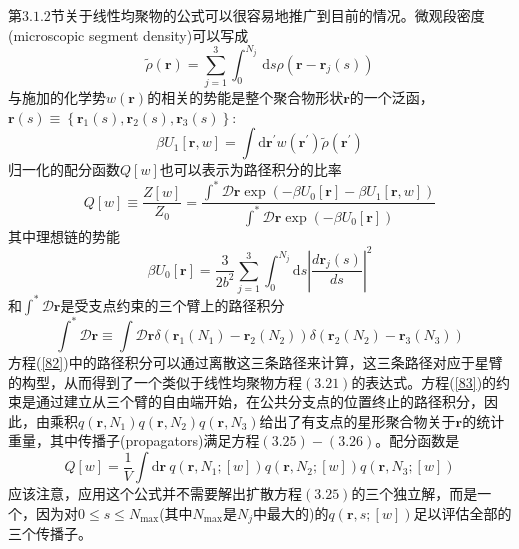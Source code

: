 第$3.1.2$节关于线性均聚物的公式可以很容易地推广到目前的情况。微观段密度(microscopic segment density)可以写成
\begin{equation}
\tilde{\rho}(\mathbf{r})=\sum_{j=1}^3 \int_{0}^{N_j}\, \mathrm{d}s\rho(\mathbf{r}-\mathbf{r}_{j}(s))
\end{equation}
与施加的化学势$w (\mathbf{r})$的相关的势能是整个聚合物形状$\mathbf{r}$的一个泛函，$\mathbf{r}(s)\equiv \left\{ \mathbf{r}_1(s),\mathbf{r}_2(s),\mathbf{r}_3(s) \right\}:$
\begin{equation}
\beta U_1[\mathbf{r},w]=\int \mathrm{d}\mathbf{r}^{'}w(\mathbf{r}^{'})\tilde{\rho}(\mathbf{r}^{'})
\end{equation}
归一化的配分函数$Q[w]$也可以表示为路径积分的比率
\begin{equation}
Q[w]\equiv \frac{Z[w]}{Z_0}=\frac{\int^{*}\mathcal{D}\mathbf{r}\exp (-\beta U_0[\mathbf{r}]-\beta U_1[\mathbf{r},w])}{\int^{*}\mathcal{D}\mathbf{r}\exp (-\beta U_0[\mathbf{r}])} \label{82}
\end{equation}
其中理想链的势能
\begin{equation}
\beta U_0[\mathbf{r}]=\frac{3}{2b^2}\sum_{j=1}^3\int_{0}^{N_j} \mathrm{d}s\left| \frac{d\mathbf{r}_j(s)}{ds} \right|^2
\end{equation}
和$\int^{*}\mathcal{D}\mathbf{r}$是受支点约束的三个臂上的路径积分
\begin{equation}
\int^{*}\mathcal{D}\mathbf{r}\equiv \int \mathcal{D}\mathbf{r}\delta (\mathbf{r}_1(N_1)-\mathbf{r}_2(N_2))\delta (\mathbf{r}_2(N_2)-\mathbf{r}_3(N_3))  \label{83}
\end{equation}
方程(\ref{82})中的路径积分可以通过离散这三条路径来计算，这三条路径对应于星臂的构型，从而得到了一个类似于线性均聚物方程$(3.21)$的表达式。方程(\ref{83})的约束是通过建立从三个臂的自由端开始，在公共分支点的位置终止的路径积分，因此，由乘积$q(\mathbf{r},N_1)q(\mathbf{r},N_2)q(\mathbf{r},N_3)$给出了有支点的星形聚合物关于$\mathbf{r}$的统计重量，其中传播子(propagators)满足方程$(3.25)-(3.26)$。配分函数是
\begin{equation}
Q[w]=\frac{1}{V}\int \mathrm{d}\mathbf{r}~q(\mathbf{r},N_1;[w])q(\mathbf{r},N_2;[w])q(\mathbf{r},N_3;[w])
\end{equation}
应该注意，应用这个公式并不需要解出扩散方程$(3.25)$的三个独立解，而是一个，因为对$0\leq s\leq N_{\max}$(其中$N_{\max}$是$N_j$中最大的)的$q(\mathbf{r},s;[w])$足以评估全部的三个传播子。

